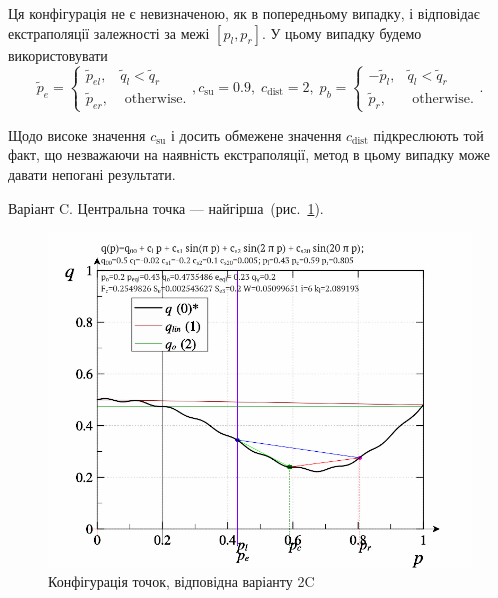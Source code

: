 Ця конфігурація не є невизначеною, як в попередньому випадку,
і відповідає екстраполяції залежності за межі
$[p_l, p_r]$. У цьому випадку будемо використовувати
%
\begin{equation}
  \tilde{p}_e
  =
  \begin{cases}
    \tilde{p}_{el}, & \tilde{q}_l < \tilde{q}_r
    \\
    \tilde{p}_{er}, & \text{ otherwise}.
  \end{cases}
  ,
  c_\mathrm{su} = 0.9, \;  c_\mathrm{dist} = 2,  \;
  p_b =
  \begin{cases}
    -\tilde{p}_l, & \tilde{q}_l < \tilde{q}_r
    \\
    \tilde{p}_r, & \text{ otherwise}.
  \end{cases}.
  \label{atu:eq:pr_e2B}
\end{equation}

Щодо високе значення
$ c_\mathrm{su} $ і досить обмежене значення
$ c_\mathrm{dist} $ підкреслюють той факт, що незважаючи на наявність
екстраполяції, метод в цьому випадку може давати непогані
результати.


Варіант C. \label{atu:d:p_eql_2C}%
%
Центральна точка --- найгірша~(рис.~\ref{atu:f:pq_2C}).

\begin{figure}[htb!]
  \begin{center}
    \includegraphics[width=60\TW]{p/pq_sin-p_pq_cbad.png}
  \end{center}
  \caption{Конфігурація точок, відповідна варіанту 2C}
  \label{atu:f:pq_2C}
\end{figure}

